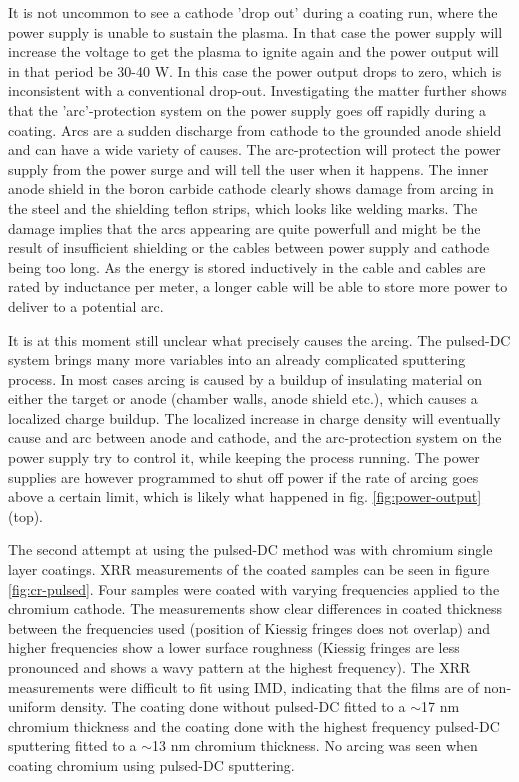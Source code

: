 It is not uncommon to see a cathode 'drop out' during a coating run, where the power supply is unable to sustain the plasma. In that case the power supply will increase the voltage to get the plasma to ignite again and the power output will in that period be 30-40 W. In this case the power output drops to zero, which is inconsistent with a conventional drop-out. Investigating the matter further shows that the 'arc'-protection system on the power supply goes off rapidly during a coating. Arcs are a sudden discharge from cathode to the grounded anode shield and can have a wide variety of causes. The arc-protection will protect the power supply from the power surge and will tell the user when it happens. The inner anode shield in the boron carbide cathode clearly shows damage from arcing in the steel and the shielding teflon strips, which looks like welding marks. The damage implies that the arcs appearing are quite powerfull and might be the result of insufficient shielding or the cables between power supply and cathode being too long. As the energy is stored inductively in the cable and cables are rated by inductance per meter, a longer cable will be able to store more power to deliver to a potential arc.

It is at this moment still unclear what precisely causes the arcing. The pulsed-DC system brings many more variables into an already complicated sputtering process. In most cases arcing is caused by a buildup of insulating material on either the target or anode (chamber walls, anode shield etc.), which causes a localized charge buildup. The localized increase in charge density will eventually cause and arc between anode and cathode, and the arc-protection system on the power supply try to control it, while keeping the process running. The power supplies are however programmed to shut off power if the rate of arcing goes above a certain limit, which is likely what happened in fig. \ref{fig:power-output} (top).
%

The second attempt at using the pulsed-DC method was with chromium single layer coatings. XRR measurements of the coated samples can be seen in figure \ref{fig:cr-pulsed}. Four samples were coated with varying frequencies applied to the chromium cathode. The measurements show clear differences in coated thickness between the frequencies used (position of Kiessig fringes does not overlap) and higher frequencies show a lower surface roughness (Kiessig fringes are less pronounced and shows a wavy pattern at the highest frequency). The XRR measurements were difficult to fit using IMD, indicating that the films are of non-uniform density. The coating done without pulsed-DC fitted to a $\sim$17 nm chromium thickness and the coating done with the highest frequency pulsed-DC sputtering fitted to a $\sim$13 nm chromium thickness. No arcing was seen when coating chromium using pulsed-DC sputtering.

